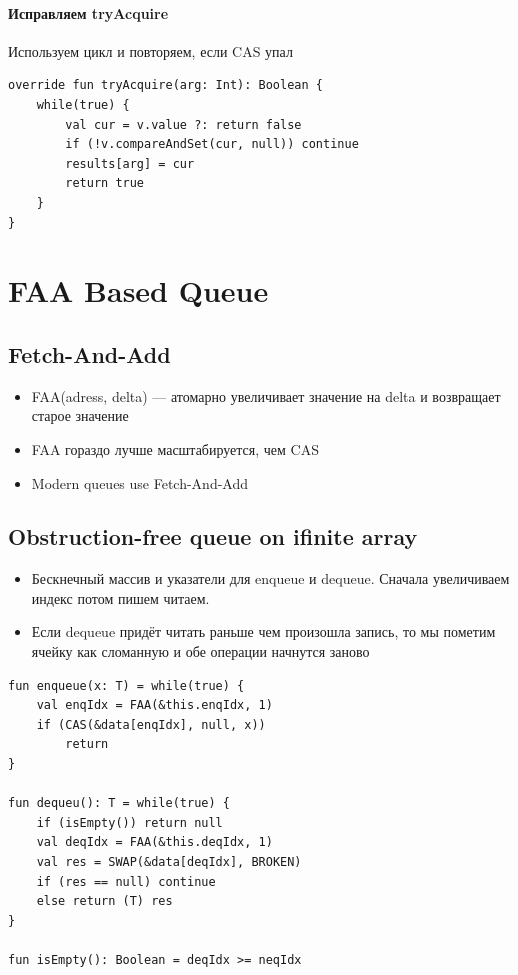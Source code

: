 \documentclass[10pt,a4paper,oneside,titlepage]{article}
\theoremstyle{plain}
\theoremstyle{defenition}
\begin{document}
\paragraph{Исправляем tryAcquire}

Используем цикл и повторяем, если CAS упал

\begin{lstlisting}
override fun tryAcquire(arg: Int): Boolean {
    while(true) {
        val cur = v.value ?: return false
        if (!v.compareAndSet(cur, null)) continue
        results[arg] = cur
        return true
    }
}
\end{lstlisting}

\section{FAA Based Queue}

\subsection{Fetch-And-Add}

\begin{itemize}
	\item FAA(adress, delta) --- атомарно увеличивает значение на delta и возвращает старое значение
	\item FAA гораздо лучше масштабируется, чем CAS
	\item Modern queues use Fetch-And-Add
\end{itemize}

\subsection{Obstruction-free queue on ifinite array}

\begin{itemize}
	\item Бескнечный массив и указатели для enqueue и dequeue. Сначала увеличиваем индекс потом пишем читаем.
	\item Если dequeue придёт читать раньше чем произошла запись, то мы пометим ячейку как сломанную и обе операции начнутся заново
\end{itemize}

\begin{lstlisting}
fun enqueue(x: T) = while(true) {
    val enqIdx = FAA(&this.enqIdx, 1)
    if (CAS(&data[enqIdx], null, x))
        return
}

fun dequeu(): T = while(true) {
    if (isEmpty()) return null
    val deqIdx = FAA(&this.deqIdx, 1)
    val res = SWAP(&data[deqIdx], BROKEN)
    if (res == null) continue
    else return (T) res
}

fun isEmpty(): Boolean = deqIdx >= neqIdx
\end{lstlisting}
\end{document}
